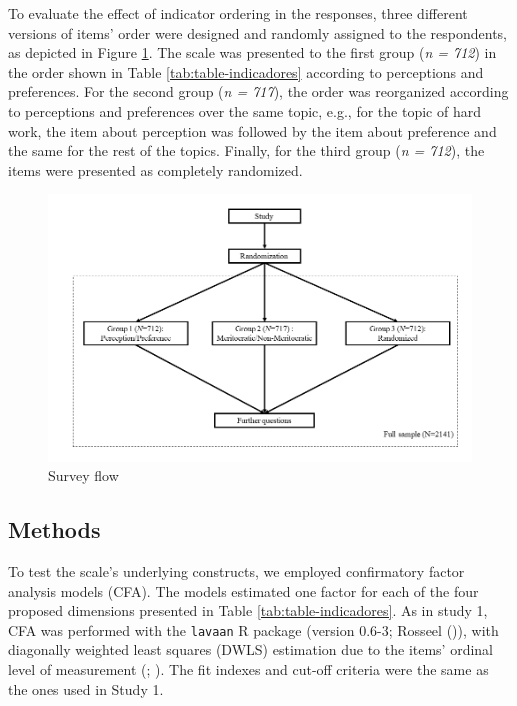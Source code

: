 \documentclass[
  10pt,
  a4paper,
]{article}
\begin{document}
To evaluate the effect of indicator ordering in the responses, three different versions of items' order were designed and randomly assigned to the respondents, as depicted in Figure \ref{fig:appmod}. The scale was presented to the first group (\emph{n = 712}) in the order shown in Table \ref{tab:table-indicadores} according to perceptions and preferences. For the second group (\emph{n = 717}), the order was reorganized according to perceptions and preferences over the same topic, e.g., for the topic of hard work, the item about perception was followed by the item about preference and the same for the rest of the topics. Finally, for the third group (\emph{n = 712}), the items were presented as completely randomized.

\begin{figure}[H]

{\centering \includegraphics[width=0.85\linewidth]{output/images/figure6} 

}

\caption{Survey flow}\label{fig:appmod}
\end{figure}

\subsection{Methods}\label{methods-1}

To test the scale's underlying constructs, we employed confirmatory factor analysis models (CFA). The models estimated one factor for each of the four proposed dimensions presented in Table \ref{tab:table-indicadores}. As in study 1, CFA was performed with the \texttt{lavaan} R package (version 0.6-3; Rosseel ()), with diagonally weighted least squares (DWLS) estimation due to the items' ordinal level of measurement (; ). The fit indexes and cut-off criteria were the same as the ones used in Study 1.
\end{document}
